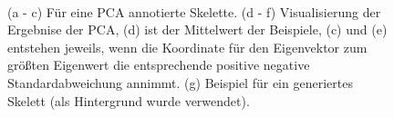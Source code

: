 \begin{figure}
  \\
  
  \caption{(a - c) Für eine PCA annotierte Skelette. (d - f) Visualisierung der Ergebnise der PCA, (d) ist der Mittelwert der Beispiele, (c) und (e) entstehen jeweils, wenn die Koordinate für den Eigenvektor zum größten Eigenwert die entsprechende positive \bzw negative Standardabweichung annimmt. (g) Beispiel für ein generiertes Skelett (als Hintergrund wurde \cite{background} verwendet).}
  \label{intro_pic}
 \end{figure}



